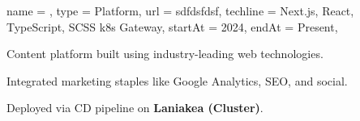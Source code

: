 \begin{projectx}{%
    name = {\gregrosdev},
    type = {Platform},
    url = sdfdsfdsf,
    techline = {Next.js, React, TypeScript, SCSS
    k8s Gateway},
    startAt = 2024,
    endAt = Present,
  }
\item Content platform built using industry-leading web technologies.
\item Integrated marketing staples like Google Analytics, SEO, and social.
\item Deployed via CD pipeline on \textbf{Laniakea (Cluster)}.
\end{projectx}
